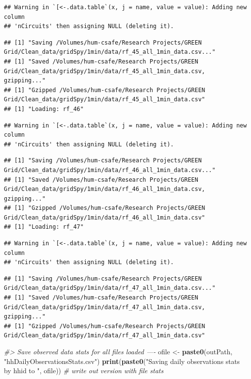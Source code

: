 \documentclass[]{article}
\newenvironment{Shaded}{\begin{snugshade}}{\end{snugshade}}
\newcommand{\KeywordTok}[1]{\textcolor[rgb]{0.13,0.29,0.53}{\textbf{#1}}}
\newcommand{\StringTok}[1]{\textcolor[rgb]{0.31,0.60,0.02}{#1}}
\newcommand{\CommentTok}[1]{\textcolor[rgb]{0.56,0.35,0.01}{\textit{#1}}}
\newcommand{\NormalTok}[1]{#1}
\begin{document}
\begin{verbatim}
## Warning in `[<-.data.table`(x, j = name, value = value): Adding new column
## 'nCircuits' then assigning NULL (deleting it).
\end{verbatim}

\begin{verbatim}
## [1] "Saving /Volumes/hum-csafe/Research Projects/GREEN Grid/Clean_data/gridSpy/1min/data/rf_45_all_1min_data.csv..."
## [1] "Saved /Volumes/hum-csafe/Research Projects/GREEN Grid/Clean_data/gridSpy/1min/data/rf_45_all_1min_data.csv, gzipping..."
## [1] "Gzipped /Volumes/hum-csafe/Research Projects/GREEN Grid/Clean_data/gridSpy/1min/data/rf_45_all_1min_data.csv"
## [1] "Loading: rf_46"
\end{verbatim}

\begin{verbatim}
## Warning in `[<-.data.table`(x, j = name, value = value): Adding new column
## 'nCircuits' then assigning NULL (deleting it).
\end{verbatim}

\begin{verbatim}
## [1] "Saving /Volumes/hum-csafe/Research Projects/GREEN Grid/Clean_data/gridSpy/1min/data/rf_46_all_1min_data.csv..."
## [1] "Saved /Volumes/hum-csafe/Research Projects/GREEN Grid/Clean_data/gridSpy/1min/data/rf_46_all_1min_data.csv, gzipping..."
## [1] "Gzipped /Volumes/hum-csafe/Research Projects/GREEN Grid/Clean_data/gridSpy/1min/data/rf_46_all_1min_data.csv"
## [1] "Loading: rf_47"
\end{verbatim}

\begin{verbatim}
## Warning in `[<-.data.table`(x, j = name, value = value): Adding new column
## 'nCircuits' then assigning NULL (deleting it).
\end{verbatim}

\begin{verbatim}
## [1] "Saving /Volumes/hum-csafe/Research Projects/GREEN Grid/Clean_data/gridSpy/1min/data/rf_47_all_1min_data.csv..."
## [1] "Saved /Volumes/hum-csafe/Research Projects/GREEN Grid/Clean_data/gridSpy/1min/data/rf_47_all_1min_data.csv, gzipping..."
## [1] "Gzipped /Volumes/hum-csafe/Research Projects/GREEN Grid/Clean_data/gridSpy/1min/data/rf_47_all_1min_data.csv"
\end{verbatim}

\begin{Shaded}
\begin{Highlighting}[]
\CommentTok{#> Save observed data stats for all files loaded ----}
\NormalTok{ofile <-}\StringTok{ }\KeywordTok{paste0}\NormalTok{(outPath, }\StringTok{"hhDailyObservationsStats.csv"}\NormalTok{)}
\KeywordTok{print}\NormalTok{(}\KeywordTok{paste0}\NormalTok{(}\StringTok{"Saving daily observations stats by hhid to "}\NormalTok{, ofile)) }\CommentTok{# write out version with file stats}
\end{Highlighting}
\end{Shaded}
\end{document}
